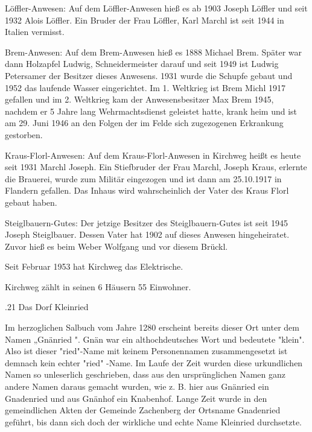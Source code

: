 Löffler-Anwesen: Auf dem Löffler-Anwesen hieß es ab 1903 Joseph Löffler und seit
1932 Alois Löffler. Ein Bruder der Frau Löffler, Karl Marchl ist seit 1944 in
Italien vermisst.

Brem-Anwesen: Auf dem Brem-Anwesen hieß es 1888 Michael Brem. Später war dann
Holzapfel Ludwig, Schneidermeister darauf und seit 1949 ist Ludwig Petersamer
der Besitzer dieses Anwesens. 1931 wurde die Schupfe gebaut und 1952 das
laufende Wasser eingerichtet. Im 1. Weltkrieg ist Brem Michl 1917 gefallen und
im 2. Weltkrieg kam der Anwesensbesitzer Max Brem 1945, nachdem er 5 Jahre lang
Wehrmachtsdienst geleistet hatte, krank heim und ist am 29. Juni 1946 an den
Folgen der im Felde sich zugezogenen Erkrankung gestorben.

Kraus-Florl-Anwesen: Auf dem Kraus-Florl-Anwesen in Kirchweg heißt es heute seit
1931 Marchl Joseph. Ein Stiefbruder der Frau Marchl, Joseph Kraus, erlernte die
Brauerei, wurde zum Militär eingezogen und ist dann am 25.10.1917 in Flandern
gefallen. Das Inhaus wird wahrscheinlich der Vater des Kraus Florl gebaut haben.

Steiglbauern-Gutes: Der jetzige Besitzer des Steiglbauern-Gutes ist seit 1945
Joseph Steiglbauer. Dessen Vater hat 1902 auf dieses Anwesen hingeheiratet.
Zuvor hieß es beim Weber Wolfgang und vor diesem Brückl.

Seit Februar 1953 hat Kirchweg das Elektrische.

Kirchweg zählt in seinen 6 Häusern 55 Einwohner.

.21 Das Dorf Kleinried

Im herzoglichen Salbuch vom Jahre 1280 erscheint bereits dieser Ort unter dem
Namen „Gnänried ". Gnän war ein althochdeutsches Wort und bedeutete "klein".
Also ist dieser "ried"-Name mit keinem Personennamen zusammengesetzt ist demnach
kein echter "ried" -Name. Im Laufe der Zeit wurden diese urkundlichen Namen so
unleserlich geschrieben, dass aus den ursprünglichen Namen ganz andere Namen
daraus gemacht wurden, wie z. B. hier aus Gnänried ein Gnadenried und aus
Gnänhof ein Knabenhof. Lange Zeit wurde in den gemeindlichen Akten der Gemeinde
Zachenberg der Ortsname Gnadenried geführt, bis dann sich doch der wirkliche und
echte Name Kleinried durchsetzte.

